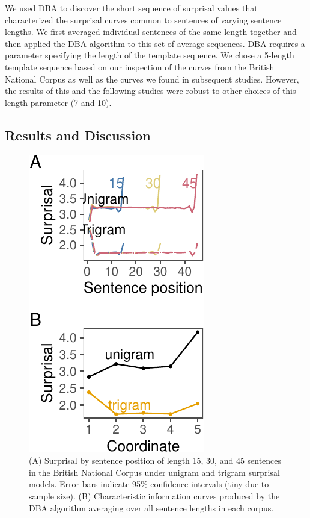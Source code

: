 \documentclass[10pt, letterpaper]{article}
\newenvironment{CodeChunk}{}{}
\begin{document}
We used DBA to discover the short sequence of surprisal values that
characterized the surprisal curves common to sentences of varying
sentence lengths. We first averaged individual sentences of the same
length together and then applied the DBA algorithm to this set of
average sequences. DBA requires a parameter specifying the length of the
template sequence. We chose a 5-length template sequence based on our
inspection of the curves from the British National Corpus as well as the
curves we found in subsequent studies. However, the results of this and
the following studies were robust to other choices of this length
parameter (7 and 10).

\hypertarget{results-and-discussion}{%
\subsection{Results and Discussion}\label{results-and-discussion}}

\begin{CodeChunk}
\begin{figure}[tb]

{\centering \includegraphics{figs/bnc_plots-1} 

}

\caption[(A) Surprisal by sentence position of length 15, 30, and 45 sentences in the British National Corpus under unigram and trigram surprisal models]{(A) Surprisal by sentence position of length 15, 30, and 45 sentences in the British National Corpus under unigram and trigram surprisal models. Error bars indicate 95\% confidence intervals (tiny due to sample size). (B) Characteristic information curves produced by the DBA algorithm averaging over all sentence lengths in each corpus. }\label{fig:bnc_plots}
\end{figure}
\end{CodeChunk}
\end{document}
